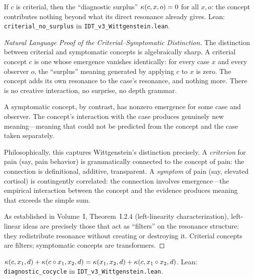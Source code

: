 \begin{theorem}
\label{thm:criterial-no-surplus}
If $c$ is criterial, then the ``diagnostic surplus''
$\kappa(c, x, o) = 0$ for all $x, o$: the concept contributes
nothing beyond what its direct resonance already gives.
Lean: \texttt{criterial\_no\_surplus} in \texttt{IDT\_v3\_Wittgenstein.lean}.
\end{theorem}

\begin{proof}[Natural Language Proof of the Criterial--Symptomatic Distinction]
The distinction between criterial and symptomatic concepts is algebraically
sharp. A criterial concept $c$ is one whose emergence vanishes identically:
for every case $x$ and every observer $o$, the ``surplus'' meaning generated
by applying $c$ to $x$ is zero. The concept adds its own resonance to the case's
resonance, and nothing more. There is no creative interaction, no surprise, no
depth grammar.

A symptomatic concept, by contrast, has nonzero emergence for some case and
observer. The concept's interaction with the case produces genuinely new
meaning---meaning that could not be predicted from the concept and the case
taken separately.

Philosophically, this captures Wittgenstein's distinction precisely. A
\emph{criterion} for pain (say, pain behavior) is grammatically connected to
the concept of pain: the connection is definitional, additive, transparent.
A \emph{symptom} of pain (say, elevated cortisol) is contingently correlated:
the connection involves emergence---the empirical interaction between the
concept and the evidence produces meaning that exceeds the simple sum.

As established in Volume~I, Theorem~I.2.4 (left-linearity characterization),
left-linear ideas are precisely those that act as ``filters'' on the resonance
structure: they redistribute resonance without creating or destroying it.
Criterial concepts are filters; symptomatic concepts are transformers.
\end{proof}

\begin{theorem}
\label{thm:diagnostic-cocycle}
$\kappa(c, x_1, d) + \kappa(c \circ x_1, x_2, d) =
\kappa(x_1, x_2, d) + \kappa(c, x_1 \circ x_2, d)$.
Lean: \texttt{diagnostic\_cocycle} in \texttt{IDT\_v3\_Wittgenstein.lean}.
\end{theorem}

